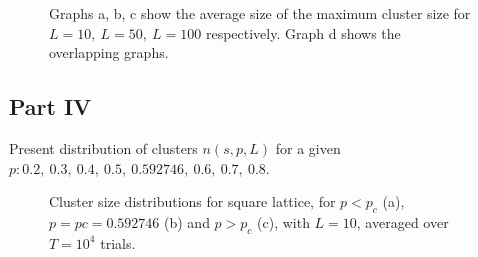 \documentclass[11pt]{article}
\begin{document}
\begin{figure}[H]
{        }
        \caption{Graphs a, b, c show the average size of the maximum cluster size for $L = 10,\ L = 50,\ L = 100$
            respectively. Graph d shows the overlapping graphs.}
        \label{fig:fifth}
    \end{figure}

    \subsection{Part IV}
    \label{subsec:part-d}
    Present distribution of clusters $n(s, p, L)$ for a given $p : 0.2,\ 0.3,\ 0.4,\ 0.5,\ 0.592746,\ 0.6,\ 0.7,\ 0.8.$

    \begin{figure}[H]
        \centering
        \bigskip
        \bigskip

        \caption{Cluster size distributions for square lattice, for $p < p_c$ (a), $p = p c = 0.592746$ (b)
            and $p > p_c$ (c), with $L = 10$, averaged over $T = 10^4$ trials.}
        \label{fig:sixth}
    \end{figure}
\end{document}
